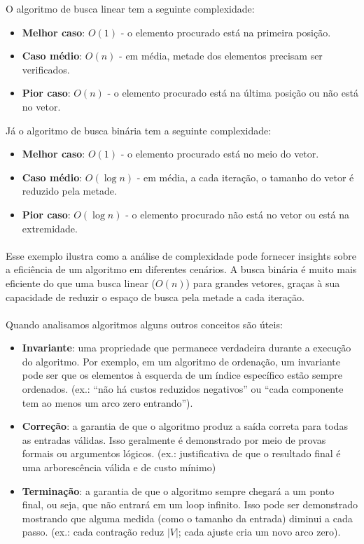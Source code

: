 \documentclass[12pt,a4paper]{article}
\begin{document}
O algoritmo de busca linear tem a seguinte complexidade:
\begin{itemize}\setlength{\itemsep}{2pt}
    \item \textbf{Melhor caso}: \(O(1)\) - o elemento procurado está na primeira posição.
    \item \textbf{Caso médio}: \(O(n)\) - em média, metade dos elementos precisam ser verificados.
    \item \textbf{Pior caso}: \(O(n)\) - o elemento procurado está na última posição ou não está no vetor.
\end{itemize}

Já o algoritmo de busca binária tem a seguinte complexidade:
\begin{itemize}\setlength{\itemsep}{2pt}
    \item \textbf{Melhor caso}: \(O(1)\) - o elemento procurado está no meio do vetor.
    \item \textbf{Caso médio}: \(O(\log n)\) - em média, a cada iteração, o tamanho do vetor é reduzido pela metade.
    \item \textbf{Pior caso}: \(O(\log n)\) - o elemento procurado não está no vetor ou está na extremidade.
\end{itemize}
 
\paragraph{}
Esse exemplo ilustra como a análise de complexidade pode fornecer insights sobre a eficiência de um algoritmo em diferentes cenários. A busca binária é muito mais eficiente do que uma busca linear (\(O(n)\)) para grandes vetores, graças à sua capacidade de reduzir o espaço de busca pela metade a cada iteração.

\paragraph{}
Quando analisamos algoritmos alguns outros conceitos são úteis:
\begin{itemize}\setlength{\itemsep}{2pt}
    \item \textbf{Invariante}: uma propriedade que permanece verdadeira durante a execução do algoritmo. Por exemplo, em um algoritmo de ordenação, um invariante pode ser que os elementos à esquerda de um índice específico estão sempre ordenados. (ex.: “não há custos reduzidos negativos” ou “cada componente tem ao menos um arco zero entrando”).
    \item \textbf{Correção}: a garantia de que o algoritmo produz a saída correta para todas as entradas válidas. Isso geralmente é demonstrado por meio de provas formais ou argumentos lógicos. (ex.: justificativa de que o resultado final é uma arborescência válida e de custo mínimo)
    \item \textbf{Terminação}: a garantia de que o algoritmo sempre chegará a um ponto final, ou seja, que não entrará em um loop infinito. Isso pode ser demonstrado mostrando que alguma medida (como o tamanho da entrada) diminui a cada passo. (ex.: cada contração reduz $|V|$; cada ajuste cria um novo arco zero).
\end{itemize}
\end{document}
